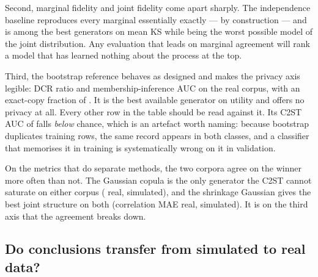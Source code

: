 \documentclass[11pt]{article}
\begin{document}
Second, marginal fidelity and joint fidelity come apart sharply. The independence
baseline reproduces every marginal essentially exactly --- by construction --- and
is among the best generators on mean KS while being the worst possible model of
the joint distribution. Any evaluation that leads on marginal agreement will
rank a model that has learned nothing about the process at the top.

Third, the bootstrap reference behaves as designed and makes the privacy axis
legible: DCR ratio \bootDcrReal{} and membership-inference AUC \bootMiaReal{} on
the real corpus, with an exact-copy fraction of \bootCopyReal{}. It is the best
available generator on utility and offers no privacy at all. Every other row in
the table should be read against it. Its C2ST AUC of \bootCtstReal{} falls
\emph{below} chance, which is an artefact worth naming: because bootstrap
duplicates training rows, the same record appears in both classes, and a
classifier that memorises it in training is systematically wrong on it in
validation.

On the metrics that do separate methods, the two corpora agree on the winner
more often than not. The Gaussian copula is the only generator the C2ST cannot
saturate on either corpus (\bestCtstRealVal{} real, \bestCtstSimVal{}
simulated), and the shrinkage Gaussian gives the best joint structure on both
(correlation MAE \bestCorrRealVal{} real, \bestCorrSimVal{} simulated). It is on
the third axis that the agreement breaks down.

\begin{table}[t]
\centering
\scriptsize
\setlength{\tabcolsep}{3.5pt}
\caption{Fidelity, utility and privacy on both corpora, mean\,$\pm$\,sd over
\nSeeds{} seeds. C2ST AUC $0.5$ is ideal; the bootstrap row's sub-chance C2ST is
the duplicate-record artefact explained in \S\ref{sec:results} and is not
comparable with the others. KS and correlation MAE lower is better;
PCA overlap and TSTR AUPRC higher is better; DCR ratio $1$ means no memorisation
and MIA AUC $0.5$ means the attack learns nothing. $^\dagger$Bootstrap is a
reference point, not a method: it copies training rows.}
\label{tab:main}
\resizebox{\linewidth}{!}{}
\end{table}

\subsection{Do conclusions transfer from simulated to real data?}
\label{sec:transfer}
\end{document}
